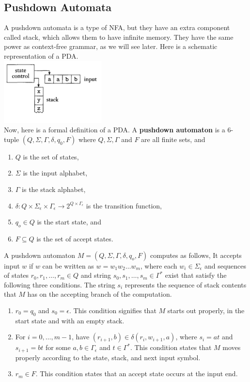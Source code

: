\documentclass[a4paper]{article}
\begin{document}
\subsection{Pushdown Automata} %
\label{sub:Push Down Automatas}
A pushdown automata is a type of NFA, but they have an extra component called stack, which allows them to have infinite memory.
They have the same power as context-free grammar, as we will see later. Here is a schematic representation of a PDA. \\
\includegraphics[scale=.6]{pda-scheme.png} \\
Now, here is a formal definition of a PDA. A {\bf pushdown automaton} is a 6-tuple $\left( Q,\Sigma, \Gamma, \delta, q_0, F \right)$ where $Q,\Sigma,\Gamma$ and $F$ are all finite sets, and
\begin{enumerate}
  \item $Q$ is the set of states,
  \item $\Sigma$ is the input alphabet,
  \item $\Gamma$ is the stack alphabet,
  \item $\delta: Q \times \Sigma_\epsilon \times \Gamma_\epsilon \rightarrow 2^{Q \times \Gamma_\epsilon}$ is the transition function,
  \item $q_o \in Q$ is the start state, and
  \item $F \subseteq Q$ is the set of accept states.
\end{enumerate}
A pushdown automaton $M=(Q,\Sigma,\Gamma,\delta,q_o,F)$ computes as follows, It accepts input $w$ if $w$ can be written as $w=w_1w_2\dots w_m$, where each $w_i \in \Sigma_\epsilon$ and sequences of states $r_0,r_1,\dots , r_m \in Q$ and string $s_0, s_1, \dots
, s_m \in \Gamma^*$ exist that satisfy the following three conditions. The string $s_i$ represents the sequence of stack contents
that $M$ has on the accepting branch of the computation.
\begin{enumerate}
  \item $r_0 = q_0$ and $s_0 = \epsilon$. This condition signifies that $M$ starts out properly, in the start state and with an
    empty stack.
  \item For $i=0, \dots, m-1$, have $(r_{i+1}, b) \in \delta(r_i,w_{i+1},a)$, where $s_i = at$ and $s_{i+1}=bt$ for some
    $a,b \in \Gamma_\epsilon$ and $t \in \Gamma^*$. This condition states that $M$ moves properly according to the state, stack,
    and next input symbol.
  \item $r_m \in F$. This condition states that an accept state occurs at the input end.
\end{enumerate}
\end{document}
